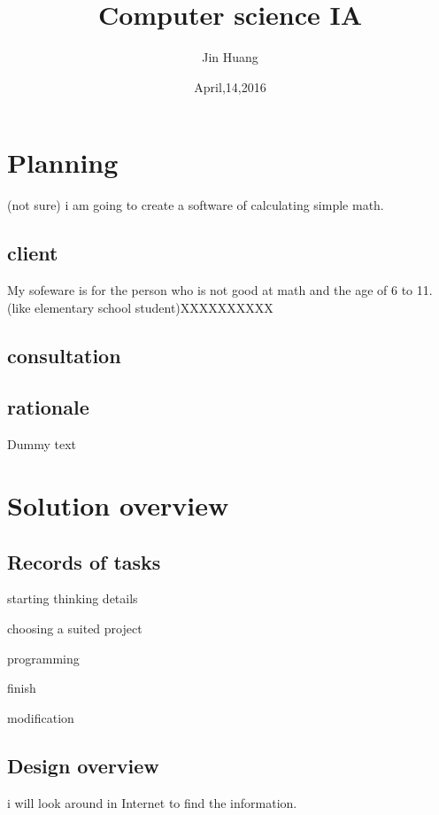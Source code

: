 \documentclass{article}
\title{Computer science IA}
\author{Jin Huang}
\date{April,14,2016}
\begin{document}
\maketitle



\tableofcontents
\newpage

\section{Planning}

(not sure) i am going to create a software of calculating simple math.

\subsection{client}
My sofeware is for the person who is not good at math and the age of 6 to 11. (like elementary school student)XXXXXXXXXX


\subsection{consultation}
\subsection{rationale}
Dummy text



\newpage

\section{Solution overview}

\subsection{Records of tasks}
    
starting thinking details

choosing a suited project

programming

finish

modification


\subsection{Design overview}
i will look around in Internet to find the information.


\newpage
\end{document}

